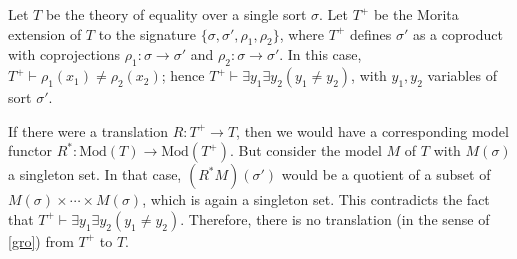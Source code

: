 \begin{example} Let $T$ be the theory of equality over a single sort
  $\sigma$.  Let $T^+$ be the Morita extension of $T$ to the signature
  $\{ \sigma ,\sigma ',\rho _1,\rho _2\}$, where $T^+$ defines
  $\sigma '$ as a coproduct with coprojections
  $\rho _1:\sigma\to\sigma '$ and $\rho _2:\sigma\to\sigma '$.  In
  this case, $T^+\vdash \rho _1(x _1)\neq \rho _2(x _2)$; hence
  $T^+\vdash \exists y_1\exists y_2(y_1\neq y_2)$, with $y_1,y_2$
  variables of sort $\sigma '$.

  If there were a translation $R:T^+\to T$, then we would have a
  corresponding model functor
  $R^*:\mathrm{Mod}(T)\to\mathrm{Mod}(T^+)$.  But consider the model
  $M$ of $T$ with $M(\sigma )$ a singleton set.  In that case,
  $(R^*M)(\sigma ')$ would be a quotient of a subset of
  $M(\sigma )\times\cdots\times M(\sigma)$, which is again a singleton
  set.  This contradicts the fact that
  $T^+\vdash \exists y_1\exists y_2(y_1\neq y_2)$.  Therefore, there
  is no translation (in the sense of \ref{gro}) from $T^+$ to
  $T$.   \end{example}

